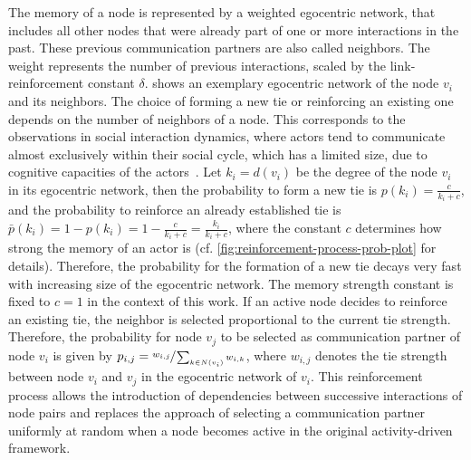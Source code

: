 The memory of a node is represented by a weighted egocentric network, that includes all other nodes that were already part of one or more interactions in the past.
These previous communication partners are also called neighbors.
The weight represents the number of previous interactions, scaled by the link-reinforcement constant \( \delta \).
 shows an exemplary egocentric network of the node \( v_{i} \) and its neighbors.
The choice of forming a new tie or reinforcing an existing one depends on the number of neighbors of a node.
This corresponds to the observations in social interaction dynamics, where actors tend to communicate almost exclusively within their social cycle, which has a limited size, due to cognitive capacities of the actors~\cite{Dunbar1992}.
Let \( k_{i} = d(v_{i}) \) be the degree of the node \( v_{i} \) in its egocentric network, then the probability to form a new tie is \( p(k_{i}) = \frac{c}{k_{i} + c} \), and the probability to reinforce an already established tie is \( \bar{p}(k_{i}) = 1 - p(k_{i}) = 1 - \frac{c}{k_{i} + c} = \frac{k_{i}}{k_{i} + c} \), where the constant \(c\) determines how strong the memory of an actor is (cf.  \cref{fig:reinforcement-process-prob-plot} for details).
Therefore, the probability for the formation of a new tie decays very fast with increasing size of the egocentric network.
The memory strength constant is fixed to \( c = 1 \) in the context of this work.
If an active node decides to reinforce an existing tie, the neighbor is selected proportional to the current tie strength.
Therefore, the probability for node \( v_{j} \) to be selected as communication partner of node \( v_{i} \) is given by
\( p_{i,j} = \sfrac{w_{i,j}}{\sum_{k \in N(v_{i})} w_{i, k}} \), where \( w_{i,j} \) denotes the tie strength between node \( v_{i} \) and \( v_{j} \) in the egocentric network of \( v_{i} \).
This reinforcement process allows the introduction of dependencies between successive interactions of node pairs and replaces the approach of selecting a communication partner uniformly at random when a node becomes active in the original activity-driven framework.


